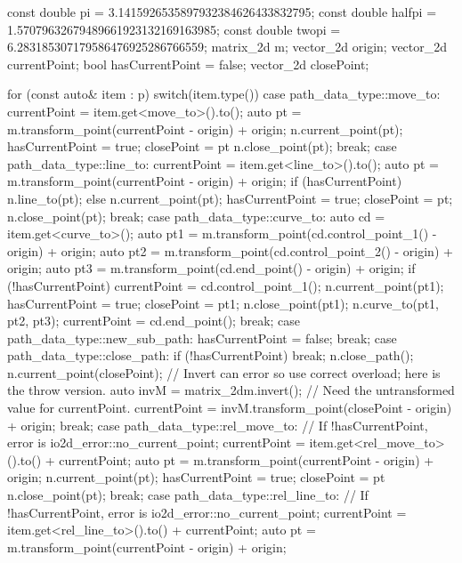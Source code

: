 \begin{codeblock}
const double pi =     3.1415926535897932384626433832795;
const double halfpi = 1.57079632679489661923132169163985;
const double twopi =  6.283185307179586476925286766559;
matrix_2d m;
vector_2d origin;
vector_2d currentPoint;
bool hasCurrentPoint = false;
vector_2d closePoint;

for (const auto& item : p) {
  switch(item.type()) {
  case path_data_type::move_to:
  {
    currentPoint = item.get<move_to>().to();
    auto pt = m.transform_point(currentPoint - origin) + origin;
    n.current_point(pt);
    hasCurrentPoint = true;
    closePoint = pt
    n.close_point(pt);
  } break;
  case path_data_type::line_to:
  {
    currentPoint = item.get<line_to>().to();
    auto pt = m.transform_point(currentPoint - origin) + origin;
    if (hasCurrentPoint) {
      n.line_to(pt);
    }
    else {
      n.current_point(pt);
      hasCurrentPoint = true;
      closePoint = pt;
      n.close_point(pt);
    }
  } break;
  case path_data_type::curve_to:
  {
    auto cd = item.get<curve_to>();
    auto pt1 = m.transform_point(cd.control_point_1() - origin) + origin;
    auto pt2 = m.transform_point(cd.control_point_2() - origin) + origin;
    auto pt3 = m.transform_point(cd.end_point() - origin) + origin;
    if (!hasCurrentPoint) {
      currentPoint = cd.control_point_1();
      n.current_point(pt1);
      hasCurrentPoint = true;
      closePoint = pt1;
      n.close_point(pt1);
    }
    n.curve_to(pt1, pt2, pt3);
    currentPoint = cd.end_point();
  } break;
  case path_data_type::new_sub_path:
  {
    hasCurrentPoint = false;
  } break;
  case path_data_type::close_path:
  {
    if (!hasCurrentPoint) {
      break;
    }
    n.close_path();
    n.current_point(closePoint);
    // Invert can error so use correct overload; here is the throw version.
    auto invM = matrix_2d{m}.invert();
    // Need the untransformed value for currentPoint.
    currentPoint = invM.transform_point(closePoint - origin) + origin;
  } break;
  case path_data_type::rel_move_to:
  {
    // If !hasCurrentPoint, error is io2d_error::no_current_point;
    currentPoint = item.get<rel_move_to>().to() + currentPoint;
    auto pt = m.transform_point(currentPoint - origin) + origin;
    n.current_point(pt);
    hasCurrentPoint = true;
    closePoint = pt    
    n.close_point(pt);
  } break;
  case path_data_type::rel_line_to:
  {
    // If !hasCurrentPoint, error is io2d_error::no_current_point;
    currentPoint = item.get<rel_line_to>().to() + currentPoint;
    auto pt = m.transform_point(currentPoint - origin) + origin;
}}}
\end{codeblock}
